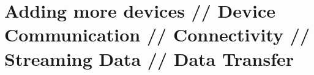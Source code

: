 \chapter{Adding more devices // Device Communication // Connectivity // Streaming Data // Data Transfer}
